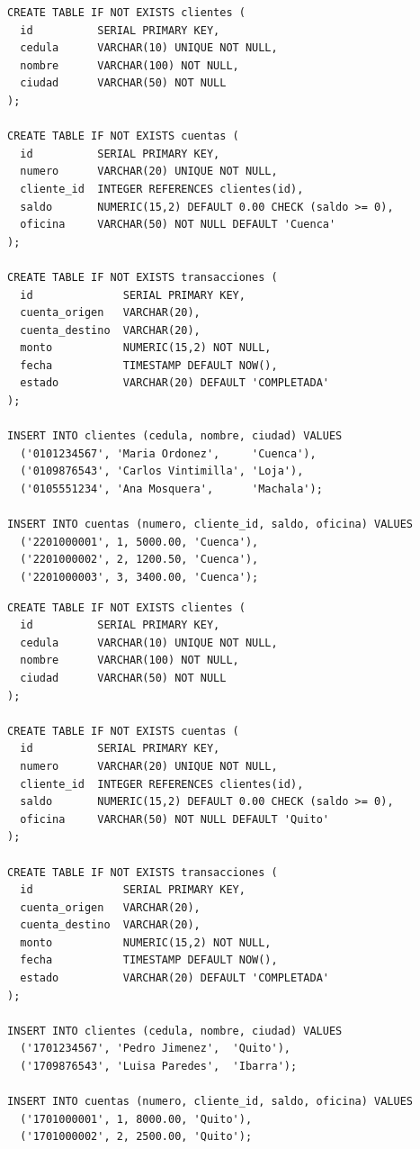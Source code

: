 \documentclass[11pt,a4paper]{article}
\begin{document}
\begin{lstlisting}[style=SQLStyle,caption={sql/init\_cuenca.sql: esquema y datos del nodo Cuenca}]
CREATE TABLE IF NOT EXISTS clientes (
  id          SERIAL PRIMARY KEY,
  cedula      VARCHAR(10) UNIQUE NOT NULL,
  nombre      VARCHAR(100) NOT NULL,
  ciudad      VARCHAR(50) NOT NULL
);

CREATE TABLE IF NOT EXISTS cuentas (
  id          SERIAL PRIMARY KEY,
  numero      VARCHAR(20) UNIQUE NOT NULL,
  cliente_id  INTEGER REFERENCES clientes(id),
  saldo       NUMERIC(15,2) DEFAULT 0.00 CHECK (saldo >= 0),
  oficina     VARCHAR(50) NOT NULL DEFAULT 'Cuenca'
);

CREATE TABLE IF NOT EXISTS transacciones (
  id              SERIAL PRIMARY KEY,
  cuenta_origen   VARCHAR(20),
  cuenta_destino  VARCHAR(20),
  monto           NUMERIC(15,2) NOT NULL,
  fecha           TIMESTAMP DEFAULT NOW(),
  estado          VARCHAR(20) DEFAULT 'COMPLETADA'
);

INSERT INTO clientes (cedula, nombre, ciudad) VALUES
  ('0101234567', 'Maria Ordonez',     'Cuenca'),
  ('0109876543', 'Carlos Vintimilla', 'Loja'),
  ('0105551234', 'Ana Mosquera',      'Machala');

INSERT INTO cuentas (numero, cliente_id, saldo, oficina) VALUES
  ('2201000001', 1, 5000.00, 'Cuenca'),
  ('2201000002', 2, 1200.50, 'Cuenca'),
  ('2201000003', 3, 3400.00, 'Cuenca');
\end{lstlisting}

\begin{lstlisting}[style=SQLStyle,caption={sql/init\_quito.sql: esquema y datos del nodo Quito}]
CREATE TABLE IF NOT EXISTS clientes (
  id          SERIAL PRIMARY KEY,
  cedula      VARCHAR(10) UNIQUE NOT NULL,
  nombre      VARCHAR(100) NOT NULL,
  ciudad      VARCHAR(50) NOT NULL
);

CREATE TABLE IF NOT EXISTS cuentas (
  id          SERIAL PRIMARY KEY,
  numero      VARCHAR(20) UNIQUE NOT NULL,
  cliente_id  INTEGER REFERENCES clientes(id),
  saldo       NUMERIC(15,2) DEFAULT 0.00 CHECK (saldo >= 0),
  oficina     VARCHAR(50) NOT NULL DEFAULT 'Quito'
);

CREATE TABLE IF NOT EXISTS transacciones (
  id              SERIAL PRIMARY KEY,
  cuenta_origen   VARCHAR(20),
  cuenta_destino  VARCHAR(20),
  monto           NUMERIC(15,2) NOT NULL,
  fecha           TIMESTAMP DEFAULT NOW(),
  estado          VARCHAR(20) DEFAULT 'COMPLETADA'
);

INSERT INTO clientes (cedula, nombre, ciudad) VALUES
  ('1701234567', 'Pedro Jimenez',  'Quito'),
  ('1709876543', 'Luisa Paredes',  'Ibarra');

INSERT INTO cuentas (numero, cliente_id, saldo, oficina) VALUES
  ('1701000001', 1, 8000.00, 'Quito'),
  ('1701000002', 2, 2500.00, 'Quito');
\end{lstlisting}
\end{document}

